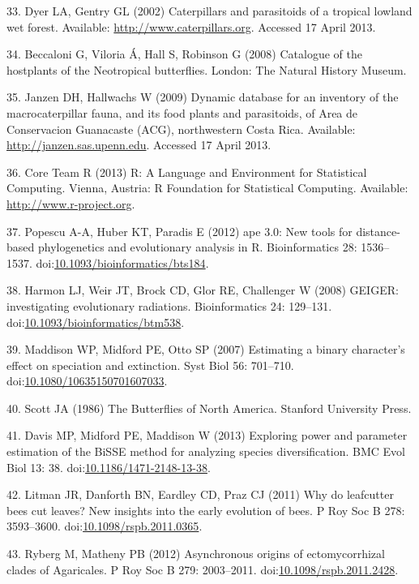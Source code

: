 \documentclass[10pt]{article}
\begin{document}
33. Dyer LA, Gentry GL (2002) Caterpillars and parasitoids of a tropical
lowland wet forest. Available: \url{http://www.caterpillars.org}.
Accessed 17 April 2013.

34. Beccaloni G, Viloria Á, Hall S, Robinson G (2008) Catalogue of the
hostplants of the Neotropical butterflies. London: The Natural History
Museum.

35. Janzen DH, Hallwachs W (2009) Dynamic database for an inventory of
the macrocaterpillar fauna, and its food plants and parasitoids, of Area
de Conservacion Guanacaste (ACG), northwestern Costa Rica. Available:
\url{http://janzen.sas.upenn.edu}. Accessed 17 April 2013.

36. Core Team R (2013) R: A Language and Environment for Statistical
Computing. Vienna, Austria: R Foundation for Statistical Computing.
Available: \url{http://www.r-project.org}.

37. Popescu A-A, Huber KT, Paradis E (2012) ape 3.0: New tools for
distance-based phylogenetics and evolutionary analysis in R.
Bioinformatics 28: 1536--1537.
doi:\href{http://dx.doi.org/10.1093/bioinformatics/bts184}{10.1093/bioinformatics/bts184}.

38. Harmon LJ, Weir JT, Brock CD, Glor RE, Challenger W (2008) GEIGER:
investigating evolutionary radiations. Bioinformatics 24: 129--131.
doi:\href{http://dx.doi.org/10.1093/bioinformatics/btm538}{10.1093/bioinformatics/btm538}.

39. Maddison WP, Midford PE, Otto SP (2007) Estimating a binary
character's effect on speciation and extinction. Syst Biol 56: 701--710.
doi:\href{http://dx.doi.org/10.1080/10635150701607033}{10.1080/10635150701607033}.

40. Scott JA (1986) The Butterflies of North America. Stanford
University Press.

41. Davis MP, Midford PE, Maddison W (2013) Exploring power and
parameter estimation of the BiSSE method for analyzing species
diversification. BMC Evol Biol 13: 38.
doi:\href{http://dx.doi.org/10.1186/1471-2148-13-38}{10.1186/1471-2148-13-38}.

42. Litman JR, Danforth BN, Eardley CD, Praz CJ (2011) Why do leafcutter
bees cut leaves? New insights into the early evolution of bees. P Roy
Soc B 278: 3593--3600.
doi:\href{http://dx.doi.org/10.1098/rspb.2011.0365}{10.1098/rspb.2011.0365}.

43. Ryberg M, Matheny PB (2012) Asynchronous origins of ectomycorrhizal
clades of Agaricales. P Roy Soc B 279: 2003--2011.
doi:\href{http://dx.doi.org/10.1098/rspb.2011.2428}{10.1098/rspb.2011.2428}.
\end{document}
